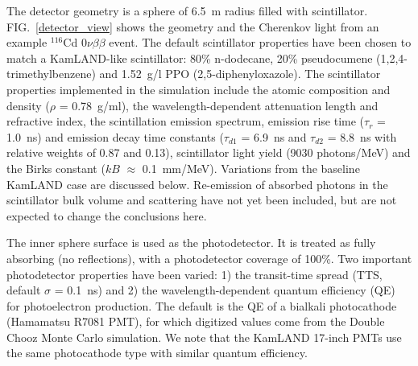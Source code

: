 \documentclass[aps,prc,twocolumn,groupedaddress,showpacs,amsmath,amssymb,floatfix,superscriptaddress]{revtex4}
\begin{document}
The detector geometry is a sphere of 6.5~m radius filled with
scintillator. FIG.~\ref{detector_view} shows the geometry and the
Cherenkov light from an example $^{116}$Cd $0\nu\beta\beta$ event. The
default scintillator properties have been chosen to match a KamLAND-like
scintillator\cite{kamland2003}: 80\% n-dodecane, 20\% pseudocumene
(1,2,4-trimethylbenzene) and 1.52~g/l PPO (2,5-diphenyloxazole). The
scintillator properties implemented in the simulation include the
atomic composition and density ($\rho$ = 0.78~g/ml), the
wavelength-dependent attenuation length\cite{tajimaMaster} and
refractive index\cite{OlegThesis}, the scintillation emission
spectrum\cite{tajimaMaster}, emission rise time ($\tau_r$ = 1.0~ns)
and emission decay time constants ($\tau_{d1}$ = 6.9~ns and
$\tau_{d2}$ = 8.8~ns with relative weights of 0.87 and 
0.13)\cite{tajimaThesis}, scintillator light yield (9030 photons/MeV)
and the Birks constant ($kB$ $\approx$ 0.1~mm/MeV)\cite{ChrisThesis}. 
Variations from the baseline KamLAND case are
discussed below. Re-emission of absorbed photons in the scintillator
bulk volume and scattering have not yet been included, but are not
expected to change the conclusions here.


The inner sphere surface is used as the photodetector. It is treated
as fully absorbing (no reflections), with a photodetector coverage of
100\%. Two important photodetector properties have been varied: 1)
the transit-time spread (TTS, default $\sigma$ = 0.1~ns) and 2) the
wavelength-dependent quantum efficiency (QE) for photoelectron
production. The default is the QE of a bialkali photocathode (Hamamatsu
R7081 PMT)\cite{Hamamatsu_R7081}, for which digitized values come from the Double Chooz\cite{dctwo}
Monte Carlo simulation. We note that the KamLAND 17-inch PMTs use the
same photocathode type with similar quantum efficiency.
\end{document}
